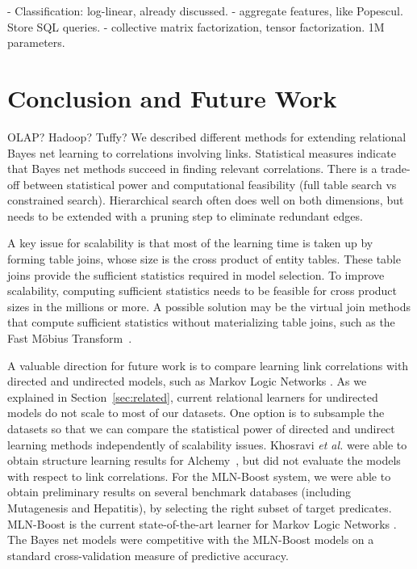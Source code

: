 \documentclass{acm_proc_article-sp}
\begin{document}
- Classification: log-linear, already discussed.
- aggregate features, like Popescul. Store SQL queries.
- collective matrix factorization, tensor factorization. 
1M parameters. 




\section{Conclusion and Future Work} 
OLAP? Hadoop? Tuffy?
We described different methods for extending relational Bayes net learning to correlations involving links. 
Statistical measures indicate that Bayes net methods succeed in finding relevant correlations. 
There is a trade-off between statistical power and computational feasibility (full table search vs constrained search). 
Hierarchical search often does well on both dimensions, but needs to be extended with a pruning step to eliminate redundant edges.

A key issue for scalability is that most of the learning time is taken up by forming table joins, whose size is the cross product of entity tables. 
These table joins provide the sufficient statistics required in model selection. 
To improve scalability, computing sufficient statistics needs to be feasible for cross product sizes in the millions or more. 
A possible solution may be the virtual join methods that compute sufficient statistics without materializing table joins, such as the Fast M\"obius Transform~\cite{Schulte2012b,Yin2004}.

A valuable direction for future work is to compare learning link correlations with directed and undirected models, such as Markov Logic Networks \cite{Domingos2009}. As we explained in Section~\ref{sec:related}, current relational learners for undirected models do not scale to most of our datasets. One option is to subsample the datasets so that we can compare the statistical power of directed and undirect learning methods
independently of scalability issues. Khosravi {\em et al.} were able to obtain structure learning results for Alchemy~\cite{Khosravi2010}, but did not evaluate the models with respect to link correlations. For the MLN-Boost system, we were able to obtain preliminary results on several benchmark databases  (including Mutagenesis and Hepatitis), by selecting the right subset of target predicates. MLN-Boost is the current state-of-the-art learner for Markov Logic Networks \cite{Khot2011}. The Bayes net models were competitive with the MLN-Boost models on a standard cross-validation measure of predictive accuracy.
\end{document}
